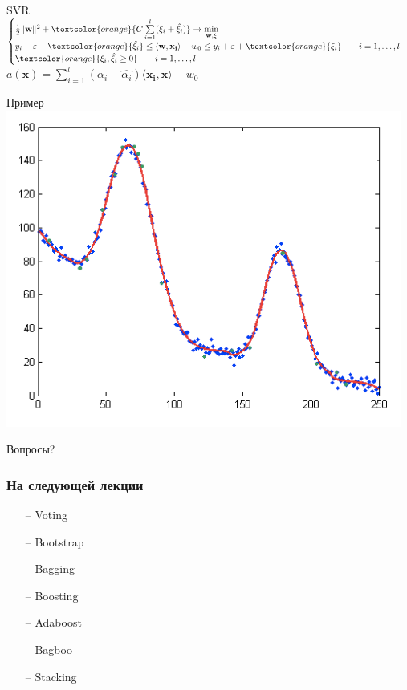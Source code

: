 \documentclass[10pt]{beamer}
\begin{document}
\begin{frame}{SVR}
  $\begin{cases}
		{\frac{1}{2}\Vert \mathbf{w} \Vert^2 + \textcolor{orange}{C \sum\limits_{i=1}^l (\xi_i + \hat{\xi_i}) } \rightarrow \min\limits_{\mathbf{w}, \xi}}\\
		y_i - \varepsilon - \textcolor{orange}{\hat{\xi_i}} \leq \langle \mathbf{w}, \mathbf{x_i} \rangle - w_0 \leq y_i + \varepsilon + \textcolor{orange}{\xi_i} \qquad i = 1, \dots, l\\
		\textcolor{orange}{\xi_i, \hat{\xi_i} \geq 0} \qquad i = 1, \dots, l
	\end{cases}$\\
	\bigbreak
  \pause
  $a(\mathbf{x}) = \sum\limits_{i=1}^l (\alpha_i - \hat{\alpha_i}) \langle \mathbf{x_i}, \mathbf{x} \rangle - w_0$
\end{frame}

\begin{frame}{Пример}
  \centering
  \includegraphics[width=0.9 \textwidth, keepaspectratio]{images/svr1}
\end{frame}

\begin{frame}[standout]
  Вопросы?
\end{frame}

\appendix

\begin{frame}\frametitle{На следующей лекции}
	\begin{itemize}
    	\item[--] Voting
    	\item[--] Bootstrap
    	\item[--] Bagging
    	\item[--] Boosting
    	\item[--] Adaboost
    	\item[--] Bagboo
    	\item[--] Stacking
	\end{itemize}
\end{frame}
\end{document}
